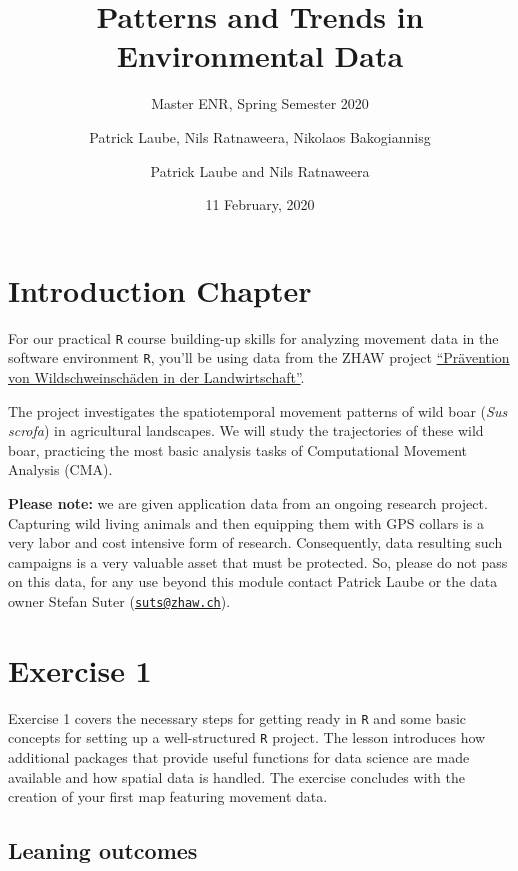 \documentclass[]{book}
\title{Patterns and Trends in Environmental Data}
\subtitle{Master ENR, Spring Semester 2020}
\author{Patrick Laube, Nils Ratnaweera, Nikolaos Bakogiannisg}
\author{Patrick Laube and Nils Ratnaweera}
\date{11 February, 2020}
\begin{document}
\maketitle

{
\setcounter{tocdepth}{1}
\tableofcontents
}
\hypertarget{introduction-chapter}{%
\chapter*{Introduction Chapter}\label{introduction-chapter}}

For our practical \texttt{R} course building-up skills for analyzing movement data in the software environment \texttt{R}, you'll be using data from the ZHAW project \href{https://www.zhaw.ch/de/lsfm/institute-zentren/iunr/integrative-oekologie/wildtiermanagement/referenzprojekte/}{``Prävention von Wildschweinschäden in der Landwirtschaft''}.

The project investigates the spatiotemporal movement patterns of wild boar (\emph{Sus scrofa}) in agricultural landscapes. We will study the trajectories of these wild boar, practicing the most basic analysis tasks of Computational Movement Analysis (CMA).

\textbf{Please note:} we are given application data from an ongoing research project. Capturing wild living animals and then equipping them with GPS collars is a very labor and cost intensive form of research. Consequently, data resulting such campaigns is a very valuable asset that must be protected. So, please do not pass on this data, for any use beyond this module contact Patrick Laube or the data owner Stefan Suter (\href{mailto:suts@zhaw.ch}{\nolinkurl{suts@zhaw.ch}}).

\hypertarget{exercise-1}{%
\chapter{Exercise 1}\label{exercise-1}}

Exercise 1 covers the necessary steps for getting ready in \texttt{R} and some basic concepts for setting up a well-structured \texttt{R} project. The lesson introduces how additional packages that provide useful functions for data science are made available and how spatial data is handled. The exercise concludes with the creation of your first map featuring movement data.

\hypertarget{leaning-outcomes}{%
\section{Leaning outcomes}\label{leaning-outcomes}}
\end{document}
